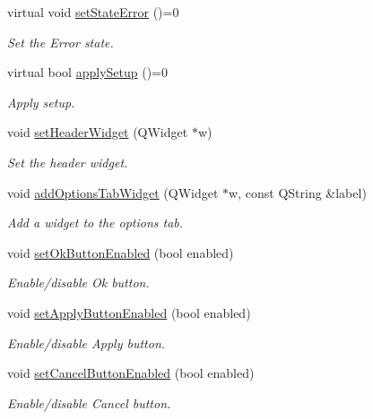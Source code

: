 \begin{DoxyCompactItemize}
virtual void \hyperlink{classmdt_abstract_port_setup_dialog_a7cd081326d0935ea06d617b821795bb9}{setStateError} ()=0
\begin{DoxyCompactList}\small\item\em Set the Error state. \end{DoxyCompactList}\item 
virtual bool \hyperlink{classmdt_abstract_port_setup_dialog_ab090cd4da49eb9f2f1fc2f507bdb9717}{applySetup} ()=0
\begin{DoxyCompactList}\small\item\em Apply setup. \end{DoxyCompactList}\item 
void \hyperlink{classmdt_abstract_port_setup_dialog_ab01700b5a09fc1b6c5f6f62e77148b43}{setHeaderWidget} (QWidget $\ast$w)
\begin{DoxyCompactList}\small\item\em Set the header widget. \end{DoxyCompactList}\item 
void \hyperlink{classmdt_abstract_port_setup_dialog_ad21fb0a1f6f2c175d12fa066c4f3f5a9}{addOptionsTabWidget} (QWidget $\ast$w, const QString \&label)
\begin{DoxyCompactList}\small\item\em Add a widget to the options tab. \end{DoxyCompactList}\item 
\hypertarget{classmdt_abstract_port_setup_dialog_a19f18be7722d2437dbab87b7a568b216}{
void \hyperlink{classmdt_abstract_port_setup_dialog_a19f18be7722d2437dbab87b7a568b216}{setOkButtonEnabled} (bool enabled)}
\label{classmdt_abstract_port_setup_dialog_a19f18be7722d2437dbab87b7a568b216}

\begin{DoxyCompactList}\small\item\em Enable/disable Ok button. \end{DoxyCompactList}\item 
\hypertarget{classmdt_abstract_port_setup_dialog_a4fa65cf9827a81bf501008ced33b69ab}{
void \hyperlink{classmdt_abstract_port_setup_dialog_a4fa65cf9827a81bf501008ced33b69ab}{setApplyButtonEnabled} (bool enabled)}
\label{classmdt_abstract_port_setup_dialog_a4fa65cf9827a81bf501008ced33b69ab}

\begin{DoxyCompactList}\small\item\em Enable/disable Apply button. \end{DoxyCompactList}\item 
\hypertarget{classmdt_abstract_port_setup_dialog_a7a63a08869469615f5be2c10fd490641}{
void \hyperlink{classmdt_abstract_port_setup_dialog_a7a63a08869469615f5be2c10fd490641}{setCancelButtonEnabled} (bool enabled)}
\label{classmdt_abstract_port_setup_dialog_a7a63a08869469615f5be2c10fd490641}

\begin{DoxyCompactList}\small\item\em Enable/disable Cancel button. \end{DoxyCompactList}\end{DoxyCompactItemize}


